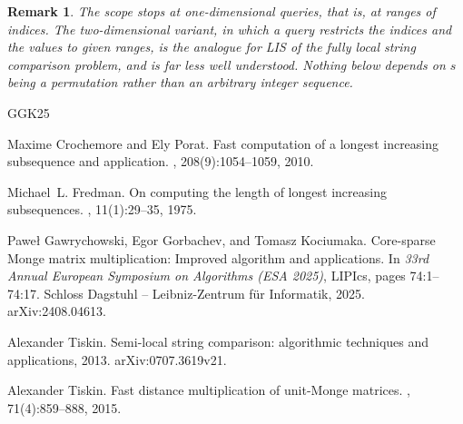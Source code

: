 \documentclass[10pt]{article}
\newtheorem{remark}[theorem]{Remark}
\begin{document}
\begin{remark}\label{rem:scope}
The scope stops at one-dimensional queries, that is, at ranges of indices. The
two-dimensional variant, in which a query restricts the indices \emph{and} the
values to given ranges, is the analogue for LIS of the fully local string
comparison problem, and is far less well understood. Nothing below depends on
$s$ being a permutation rather than an arbitrary integer sequence.
\end{remark}

\begin{thebibliography}{GGK25}

Maxime Crochemore and Ely Porat.
\newblock Fast computation of a longest increasing subsequence and application.
, 208(9):1054--1059, 2010.

Michael~L. Fredman.
\newblock On computing the length of longest increasing subsequences.
, 11(1):29--35, 1975.

Pawe{\l} Gawrychowski, Egor Gorbachev, and Tomasz Kociumaka.
\newblock Core-sparse {M}onge matrix multiplication: Improved algorithm and
  applications.
\newblock In {\em 33rd Annual European Symposium on Algorithms (ESA 2025)},
  LIPIcs, pages 74:1--74:17. Schloss Dagstuhl -- Leibniz-Zentrum f\"{u}r
  Informatik, 2025.
\newblock arXiv:2408.04613.

Alexander Tiskin.
\newblock Semi-local string comparison: algorithmic techniques and
  applications, 2013.
\newblock arXiv:0707.3619v21.

Alexander Tiskin.
\newblock Fast distance multiplication of unit-{M}onge matrices.
, 71(4):859--888, 2015.

\end{thebibliography}
\end{document}
